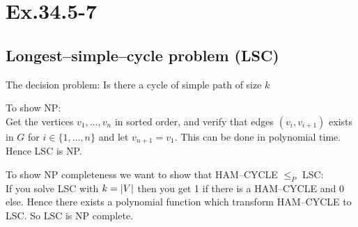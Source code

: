 \section*{Ex.34.5-7}
\subsection*{Longest--simple--cycle problem (LSC)}

The decision problem: Is there a cycle of simple path of size $k$

To show NP:
\\
Get the vertices $v_1,\ldots, v_n$ in sorted order, and verify that edges $(v_i, v_{i+1})$ exists in $G$ for $i\in\{1,\ldots,n\}$ and let $v_{n+1} = v_1$. This can be done in polynomial time. Hence LSC is NP.

To show NP completeness we want to show that HAM--CYCLE $\leq_P$ LSC:
\\
If you solve LSC with  $k=\abs*{V}$ then you get 1 if there is a HAM--CYCLE and 0 else. Hence there exists a polynomial function which transform HAM--CYCLE to LSC. So LSC is NP complete.	